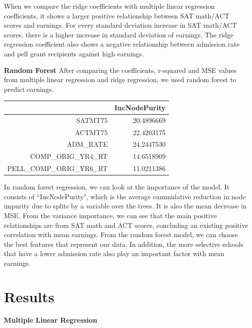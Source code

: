 \documentclass{article}
\begin{document}
  When we compare the ridge coefficients with multiple linear regression coefficients, it shows a larger positive relationship between SAT math/ACT scores and earnings.  For every standard deviation increase in SAT math/ACT scores, there is a higher increase in standard deviation of earnings. The ridge regression coefficient also shows a negative relationship between admission rate and pell grant recipients against high earnings.
\newline
\newline

\textbf{Random Forest} \newline
  After comparing the coefficients, r-squared and MSE values from multiple linear regression and ridge regression, we used random forest to predict earnings. 

\begin{table}[ht]
\centering
\begin{tabular}{rr}
  \hline
 & IncNodePurity \\ 
  \hline
SATMT75 & 20.4896669 \\ 
  ACTMT75 & 22.4203175 \\ 
  ADM\_RATE & 24.2447530 \\ 
  COMP\_ORIG\_YR4\_RT & 14.6518909 \\ 
  PELL\_COMP\_ORIG\_YR6\_RT & 11.0211386 \\ 
   \hline
\end{tabular}
\end{table}
  In random forest regression, we can look at the importance of the model.   It consists of ``IncNodePurity", which is the average cummulative reduction in node impurity due to splits by a variable over the trees. It is also the mean decrease in MSE.   From the variance importance, we can see that the main positive relationships are from SAT math and ACT scores, concluding an existing positive correlation with mean earnings.   From the random forest model, we can choose the best features that represent our data.  In addition, the more selective schools that have a lower admission rate also play an important factor with mean earnings. 


\section{Results}

\textbf{Multiple Linear Regression}\newline
\end{document}

